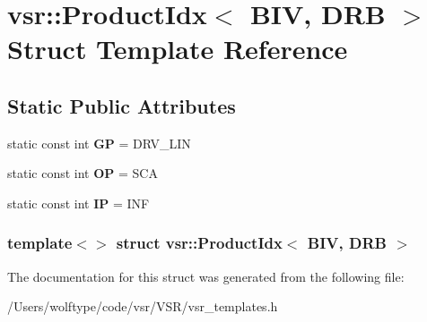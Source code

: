 \hypertarget{structvsr_1_1_product_idx_3_01_b_i_v_00_01_d_r_b_01_4}{\section{vsr\-:\-:Product\-Idx$<$ B\-I\-V, D\-R\-B $>$ Struct Template Reference}
\label{structvsr_1_1_product_idx_3_01_b_i_v_00_01_d_r_b_01_4}
}
\subsection*{Static Public Attributes}
\begin{DoxyCompactItemize}
\item 
\hypertarget{structvsr_1_1_product_idx_3_01_b_i_v_00_01_d_r_b_01_4_a7b3168141eb5a2124611ca7dbe3ec2d6}{static const int {\bfseries G\-P} = D\-R\-V\-\_\-\-L\-I\-N}\label{structvsr_1_1_product_idx_3_01_b_i_v_00_01_d_r_b_01_4_a7b3168141eb5a2124611ca7dbe3ec2d6}

\item 
\hypertarget{structvsr_1_1_product_idx_3_01_b_i_v_00_01_d_r_b_01_4_aca04422908e673fb54b8df23e99bf053}{static const int {\bfseries O\-P} = S\-C\-A}\label{structvsr_1_1_product_idx_3_01_b_i_v_00_01_d_r_b_01_4_aca04422908e673fb54b8df23e99bf053}

\item 
\hypertarget{structvsr_1_1_product_idx_3_01_b_i_v_00_01_d_r_b_01_4_a4c1e16e56ec552d85345d6bb9b08b232}{static const int {\bfseries I\-P} = I\-N\-F}\label{structvsr_1_1_product_idx_3_01_b_i_v_00_01_d_r_b_01_4_a4c1e16e56ec552d85345d6bb9b08b232}

\end{DoxyCompactItemize}
\subsubsection*{template$<$$>$ struct vsr\-::\-Product\-Idx$<$ B\-I\-V, D\-R\-B $>$}



The documentation for this struct was generated from the following file\-:\begin{DoxyCompactItemize}
\item 
/\-Users/wolftype/code/vsr/\-V\-S\-R/vsr\-\_\-templates.\-h\end{DoxyCompactItemize}
